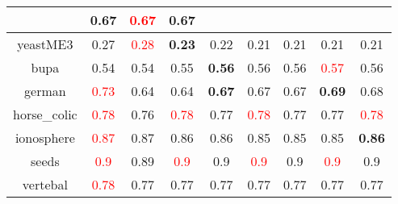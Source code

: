 \documentclass{article}%
\begin{document}
\begin{tabular}{c|cccccccc}
{}&0.67&\textcolor{red}{ 
0.67
}&0.67\\%
\hline%
yeastME3&0.27&\textcolor{red}{ 
0.28
}&\textbf{0.23}&0.22&0.21&0.21&0.21&0.21\\%
\hline%
bupa&0.54&0.54&0.55&\textbf{0.56}&0.56&0.56&\textcolor{red}{ 
0.57
}&0.56\\%
\hline%
german&\textcolor{red}{ 
0.73
}&0.64&0.64&\textbf{0.67}&0.67&0.67&\textbf{0.69}&0.68\\%
\hline%
horse\_colic&\textcolor{red}{ 
0.78
}&0.76&\textcolor{red}{ 
0.78
}&0.77&\textcolor{red}{ 
0.78
}&0.77&0.77&\textcolor{red}{ 
0.78
}\\%
\hline%
ionosphere&\textcolor{red}{ 
0.87
}&0.87&0.86&0.86&0.85&0.85&0.85&\textbf{0.86}\\%
\hline%
seeds&\textcolor{red}{ 
0.9
}&0.89&\textcolor{red}{ 
0.9
}&0.9&\textcolor{red}{ 
0.9
}&0.9&\textcolor{red}{ 
0.9
}&0.9\\%
\hline%
vertebal&\textcolor{red}{ 
0.78
}&0.77&0.77&0.77&0.77&0.77&0.77&0.77\\%
\hline%
\end{tabular}

%
\end{document}
